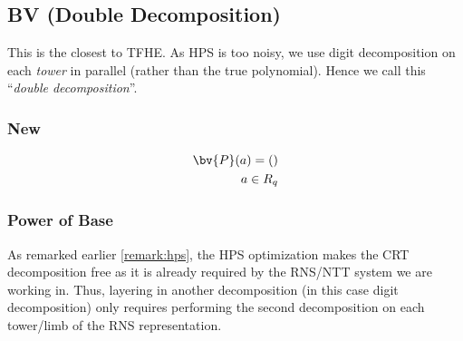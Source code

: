 
\subsection{BV (Double Decomposition)}
This is the closest to TFHE. As HPS is too noisy, we use digit decomposition on each \textit{tower} in parallel (rather than the true polynomial). Hence we call this ``\textit{double decomposition}''.

\subsubsection{New}
\begin{align}
    \bv{P}(a) = ()\\
    a \in R_q
\end{align}


\subsubsection{Power of Base}
As remarked earlier \autoref{remark:hps}, the HPS optimization makes the CRT decomposition free as it is already required by the RNS/NTT system we are working in. Thus, layering in another decomposition (in this case digit decomposition) only requires performing the second decomposition on each tower/limb of the RNS representation.


